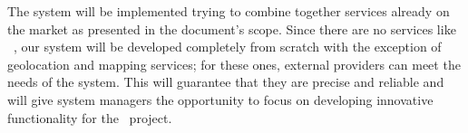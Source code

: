 The system will be implemented trying to combine together services already on the market as presented in the document's scope. Since there are no services like \projectname~, our system will be developed completely from scratch with the exception of geolocation and mapping services; for these ones, external providers can meet the needs of the system. This will guarantee that they are precise and reliable and will give system managers the opportunity to focus on developing innovative functionality for the \projectname~project.
